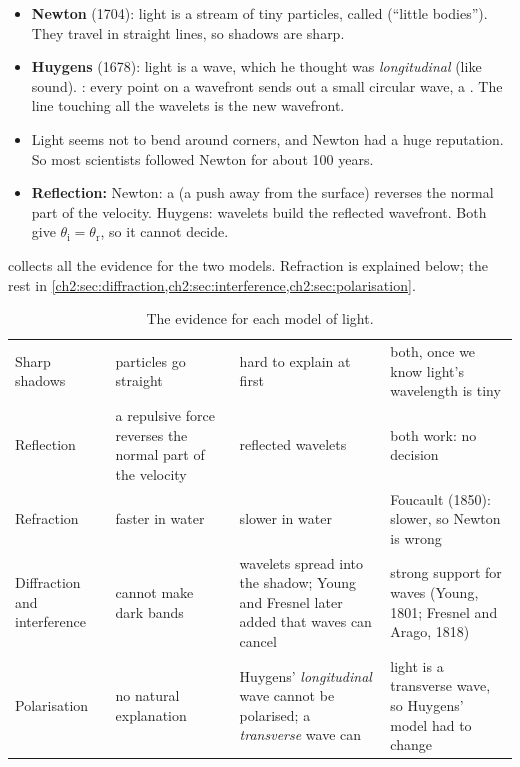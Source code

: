 \begin{itemize}
  \item \textbf{Newton} (1704): light is a stream of tiny particles, called 
        (``little bodies''). They travel in straight lines, so shadows are sharp.
  \item \textbf{Huygens} (1678): light is a wave, which he thought was \emph{longitudinal}
        (like sound).
        : every point on a wavefront sends out a small circular
        wave, a . The line touching all the wavelets is the new wavefront.
  \item Light seems not to bend around corners, and Newton had a huge reputation. So most
        scientists followed Newton for about 100 years.
  \item \textbf{Reflection:} Newton: a  (a push away from the surface)
        reverses the normal part of the velocity. Huygens: wavelets build the reflected
        wavefront. Both give $\theta_\mathrm{i} = \theta_\mathrm{r}$, so it cannot decide.
\end{itemize}

 collects all the evidence for the two models. Refraction is
explained below; the rest in \cref{ch2:sec:diffraction,ch2:sec:interference,ch2:sec:polarisation}.

\begin{table}
  \caption{The evidence for each model of light.}\label{ch2:tab:evidence}
  \centering\small
  \begin{tabular}{@{}L{25mm}L{31mm}L{36mm}L{40mm}@{}}
    \toprule
     &  &  &
      \\
    \midrule
    Sharp shadows & particles go straight & hard to explain at first &
      both, once we know light's wavelength is tiny\\
    Reflection & a repulsive force reverses the normal part of the velocity &
      reflected wavelets & both work: no decision\\
    Refraction & faster in water & slower in water & Foucault (1850): slower, so
      Newton is wrong\\
    Diffraction and interference & cannot make dark bands & wavelets spread into the
      shadow; Young and Fresnel later added that waves can cancel & strong support for waves
      (Young, 1801; Fresnel and Arago, 1818)\\
    Polarisation & no natural explanation & Huygens' \emph{longitudinal} wave cannot be
      polarised; a \emph{transverse} wave can & light is a transverse wave, so Huygens'
      model had to change\\
    \bottomrule
  \end{tabular}
\end{table}

